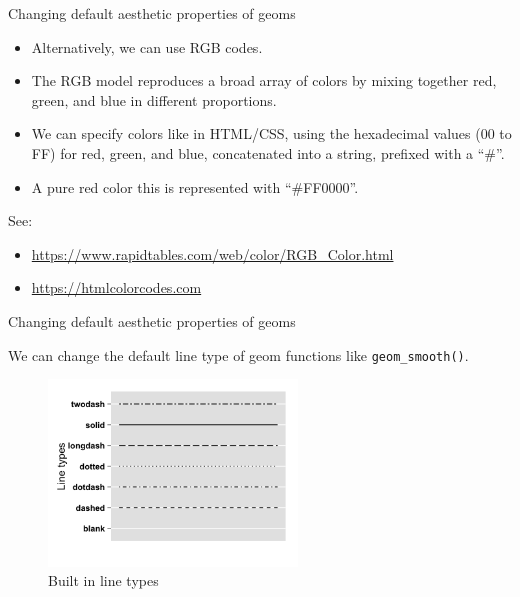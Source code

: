 \documentclass[ignorenonframetext,]{beamer}
\providecommand{\tightlist}{%
  \setlength{\itemsep}{0pt}\setlength{\parskip}{0pt}}
\begin{document}
\begin{frame}{Changing default aesthetic properties of geoms}
\protect\hypertarget{changing-default-aesthetic-properties-of-geoms-17}{}

\begin{itemize}
\item
  Alternatively, we can use RGB codes.
\item
  The RGB model reproduces a broad array of colors by mixing together
  red, green, and blue in different proportions.
\item
  We can specify colors like in HTML/CSS, using the hexadecimal values
  (00 to FF) for red, green, and blue, concatenated into a string,
  prefixed with a ``\#''.
\item
  A pure red color this is represented with ``\#FF0000''.
\end{itemize}

See:

\begin{itemize}
\tightlist
\item
  \url{https://www.rapidtables.com/web/color/RGB_Color.html}
\item
  \url{https://htmlcolorcodes.com}
\end{itemize}

\end{frame}

\begin{frame}[fragile]{Changing default aesthetic properties of geoms}
\protect\hypertarget{changing-default-aesthetic-properties-of-geoms-18}{}

We can change the default line type of geom functions like
\texttt{geom\_smooth()}.

\begin{figure}
\centering
\includegraphics[width=2.60417in,height=\textheight]{figures/lty.png}
\caption{Built in line types}
\end{figure}

\end{frame}
\end{document}
